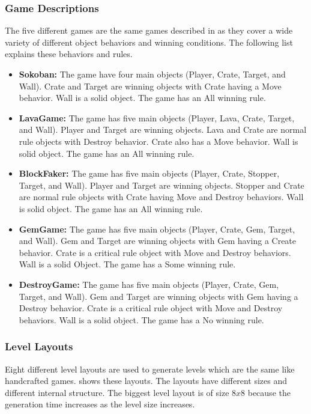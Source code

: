 \subsubsection{Game Descriptions}
The five different games are the same games described in  as they cover a wide variety of different object behaviors and winning conditions. The following list explains these behaviors and rules.
\begin{itemize}
	\item \textbf{Sokoban:} The game have four main objects (Player, Crate, Target, and Wall). Crate and Target are winning objects with Crate having a Move behavior. Wall is a solid object. The game has an All winning rule.
	
	\item \textbf{LavaGame:} The game has five main objects (Player, Lava, Crate, Target, and Wall). Player and Target are winning objects. Lava and Crate are normal rule objects with Destroy behavior. Crate also has a Move behavior. Wall is solid object. The game has an All winning rule.
	
	\item \textbf{BlockFaker:} The game has five main objects (Player, Crate, Stopper, Target, and Wall). Player and Target are winning objects. Stopper and Crate are normal rule objects with Crate having Move and Destroy behaviors. Wall is solid object. The game has an All winning rule.
	
	\item \textbf{GemGame:} The game has five main objects (Player, Crate, Gem, Target, and Wall). Gem and Target are winning objects with Gem having a Create behavior. Crate is a critical rule object with Move and Destroy behaviors. Wall is a solid Object. The game has a Some winning rule.
	
	\item \textbf{DestroyGame:} The game has five main objects (Player, Crate, Gem, Target, and Wall). Gem and Target are winning objects with Gem having a Destroy behavior. Crate is a critical rule object with Move and Destroy behaviors. Wall is a solid object. The game has a No winning rule.
\end{itemize}

\subsubsection{Level Layouts}
Eight different level layouts are used to generate levels which are the same like handcrafted games.  shows these layouts. The layouts have different sizes and different internal structure. The biggest level layout is of size $8x8$ because the generation time increases as the level size increases.

